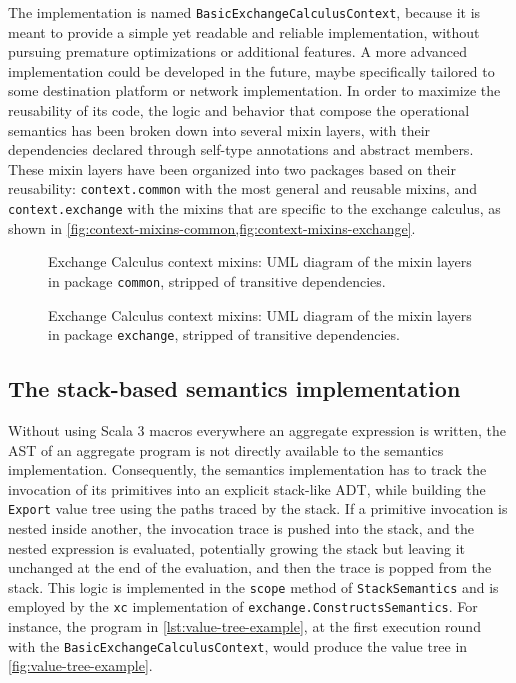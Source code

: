 The implementation is named \texttt{BasicExchangeCalculusContext}, because it is meant to provide a simple yet readable and reliable implementation, without pursuing premature optimizations or additional features.
%
A more advanced implementation could be developed in the future, maybe specifically tailored to some destination platform or network implementation.
%
In order to maximize the reusability of its code, the logic and behavior that compose the operational semantics has been broken down into several mixin layers, with their dependencies declared through self-type annotations and abstract members.
%
These mixin layers have been organized into two packages based on their reusability: \texttt{context.common} with the most general and reusable mixins, and \texttt{context.exchange} with the mixins that are specific to the exchange calculus, as shown in \cref{fig:context-mixins-common,fig:context-mixins-exchange}.

\begin{figure}
    \centering
    \caption{Exchange Calculus context mixins: \ac{UML} diagram of the mixin layers in package \texttt{common}, stripped of transitive dependencies.}
    \label{fig:context-mixins-common}
    \bigskip
    \resizebox{\linewidth}{!}{
        
    }
\end{figure}

\begin{figure}
    \centering
    \caption{Exchange Calculus context mixins: \ac{UML} diagram of the mixin layers in package \texttt{exchange}, stripped of transitive dependencies.}
    \label{fig:context-mixins-exchange}
    \bigskip
    \resizebox{\linewidth}{!}{
        
    }
\end{figure}


\subsection{The stack-based semantics implementation}

Without using Scala 3 macros everywhere an aggregate expression is written, the \ac{AST} of an aggregate program is not directly available to the semantics implementation.
%
Consequently, the semantics implementation has to track the invocation of its primitives into an explicit stack-like \ac{ADT}, while building the \texttt{Export} value tree using the paths traced by the stack.
%
If a primitive invocation is nested inside another, the invocation trace is pushed into the stack, and the nested expression is evaluated, potentially growing the stack but leaving it unchanged at the end of the evaluation, and then the trace is popped from the stack.
%
This logic is implemented in the \texttt{scope} method of \texttt{StackSemantics} and is employed by the \texttt{xc} implementation of \texttt{exchange.ConstructsSemantics}.
%
For instance, the program in \cref{lst:value-tree-example}, at the first execution round with the \texttt{BasicExchangeCalculusContext}, would produce the value tree in \cref{fig:value-tree-example}.

